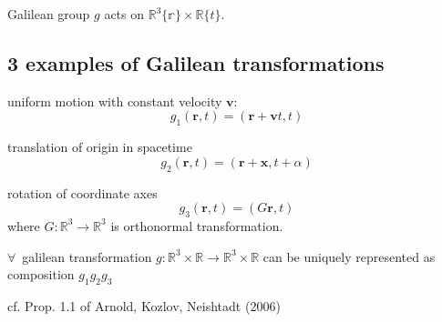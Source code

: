 Galilean group $g$ acts on $\mathbb{R}^3\lbrace \mathbb{r} \rbrace \times \mathbb{R} \lbrace t \rbrace$. \\

\subsection{3 examples of Galilean transformations}

uniform motion with constant velocity $\mathbf{v}$:
\begin{equation}
g_1(\mathbf{r}, t) = (\mathbf{r} + \mathbf{v} t, t)
\end{equation}

translation of origin in spacetime
\begin{equation}
g_2(\mathbf{r}, t) = (\mathbf{r} + \mathbf{x} , t + \alpha )
\end{equation}

rotation of coordinate axes
\begin{equation}
g_3(\mathbf{r}, t) = (G \mathbf{r}, t)
\end{equation}
where $G: \mathbb{R}^3 \to \mathbb{R}^3$ is orthonormal transformation.

\begin{proposition}
	$\forall \, $ galilean transformation $g: \mathbb{R}^3 \times \mathbb{R} \to \mathbb{R}^3 \times \mathbb{R}$ can be uniquely represented as composition $g_1g_2 g_3$
\end{proposition}
cf. Prop. 1.1 of Arnold, Kozlov, Neishtadt (2006) \cite{dgdt:AKN2006} 

